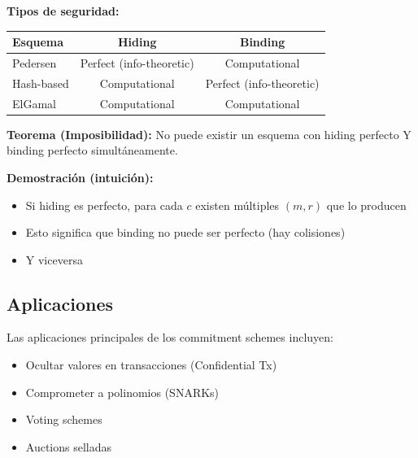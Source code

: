\documentclass[11pt,a4paper,twoside]{book}
\begin{document}
\begin{mathnote}
\textbf{Tipos de seguridad:}

\begin{center}
\begin{tabular}{lcc}
\toprule
\textbf{Esquema} & \textbf{Hiding} & \textbf{Binding} \\
\midrule
Pedersen & Perfect (info-theoretic) & Computational \\
Hash-based & Computational & Perfect (info-theoretic) \\
ElGamal & Computational & Computational \\
\bottomrule
\end{tabular}
\end{center}

\textbf{Teorema (Imposibilidad):} No puede existir un esquema con hiding perfecto Y binding perfecto simult\'aneamente.

\textbf{Demostraci\'on (intuici\'on):}
\begin{itemize}
    \item Si hiding es perfecto, para cada $c$ existen m\'ultiples $(m, r)$ que lo producen
    \item Esto significa que binding no puede ser perfecto (hay colisiones)
    \item Y viceversa
\end{itemize}
\end{mathnote}

\subsection{Aplicaciones}

Las aplicaciones principales de los commitment schemes incluyen:
\begin{itemize}
    \item Ocultar valores en transacciones (Confidential Tx)
    \item Comprometer a polinomios (SNARKs)
    \item Voting schemes
    \item Auctions selladas
\end{itemize}
\end{document}
